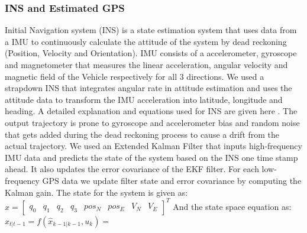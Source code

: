 \documentclass[conference]{IEEEtran}
\begin{document}
\subsubsection{INS and Estimated GPS}
Initial Navigation system (INS) is a state estimation system that uses data from a IMU to continuously calculate the attitude of the system by dead reckoning (Position, Velocity and Orientation). IMU consists of a accelerometer, gyroscope and magnetometer that measures the linear acceleration, angular velocity and magnetic field of the Vehicle respectively for all 3 directions. We used a strapdown INS that integrates angular rate in attitude estimation and uses the attitude data to transform the IMU acceleration into latitude, longitude and heading. A detailed explanation and equations used for INS are given here \cite{6}\cite{7}. The output trajectory is prone to gyroscope and accelerometer bias and random noise that gets added during the dead reckoning process to cause a drift from the actual trajectory. We used an Extended Kalman Filter that inputs high-frequency IMU data and predicts the state of the system based on the INS one time stamp ahead. It also updates the error covariance of the EKF filter. For each low-frequency GPS data we update filter state and error covariance by computing the Kalman gain. The state for the system is given as: $ x= \begin{bmatrix}
q_0 & q_1 & q_2 & q_3 & pos_N & pos_E & V_N & V_E
\end{bmatrix}^T$
And the state space equation as:\\
        $x_{t|t-1} = f(\hat{x}_{k-1|k-1},u_k)=$
\end{document}
